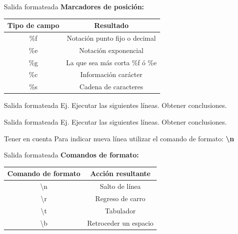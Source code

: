 \documentclass{bredelebeamer}
\begin{document}
\begin{frame}{Salida formateada}
\textbf{Marcadores de posición:}
\begin{table}[]
\centering
\begin{tabular}{|c|c|}
\hline
Tipo de campo & Resultado                      \\ \hline
\%f           & Notación punto fijo o decimal  \\ \hline
\%e           & Notación exponencial           \\ \hline
\%g           & La que sea más corta \%f ó \%e \\ \hline
\%c           & Información carácter           \\ \hline
\%s           & Cadena de caracteres           \\ \hline
\end{tabular}
\end{table}
\end{frame}

\begin{frame}{Salida formateada}
Ej. Ejecutar las siguientes líneas. Obtener conclusiones.

\end{frame}

\begin{frame}{Salida formateada}
Ej. Ejecutar las siguientes líneas. Obtener conclusiones.

\begin{block}{Tener en cuenta}
Para indicar nueva línea utilizar el comando de formato: \textbf{\textbackslash n}
\end{block}
\end{frame}

\begin{frame}{Salida formateada}
\textbf{Comandos de formato:}
\begin{table}[]
\centering
\begin{tabular}{|c|c|}
\hline
Comando de formato & Acción resultante     \\ \hline
\textbackslash{}n  & Salto de línea        \\ \hline
\textbackslash{}r  & Regreso de carro      \\ \hline
\textbackslash{}t  & Tabulador             \\ \hline
\textbackslash{}b  & Retroceder un espacio \\ \hline
\end{tabular}
\end{table}
\end{frame}
\end{document}
